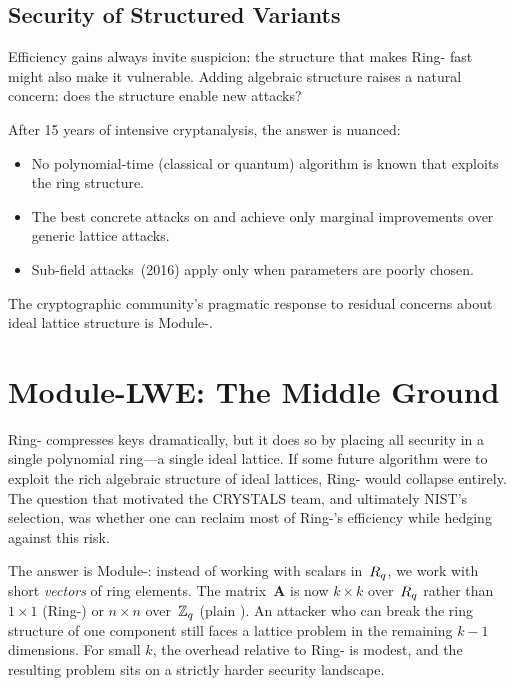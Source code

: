 \subsection{Security of Structured Variants}
\label{subsec:ring-security}

Efficiency gains always invite suspicion: the structure that makes Ring-\lwe{} fast might also make it vulnerable.  Adding algebraic structure raises a natural concern: does the structure enable new attacks?

After 15 years of intensive cryptanalysis, the answer is nuanced:
\begin{itemize}
\item No polynomial-time (classical or quantum) algorithm is known that exploits the ring structure.
\item The best concrete attacks on \rlwe{} and \mlwe{} achieve only marginal improvements over generic lattice attacks.
\item Sub-field attacks~(2016) apply only when parameters are poorly chosen.
\end{itemize}

The cryptographic community's pragmatic response to residual concerns about ideal lattice structure is Module-\lwe{}.


\section{Module-LWE: The Middle Ground}
\label{sec:module-lwe}

Ring-\lwe{} compresses keys dramatically, but it does so by placing all security in a single polynomial ring---a single ideal lattice.  If some future algorithm were to exploit the rich algebraic structure of ideal lattices, Ring-\lwe{} would collapse entirely.  The question that motivated the CRYSTALS team, and ultimately NIST's selection, was whether one can reclaim most of Ring-\lwe{}'s efficiency while hedging against this risk.

The answer is Module-\lwe{}: instead of working with scalars in~$R_q$, we work with short \emph{vectors} of ring elements.  The matrix~$\mathbf{A}$ is now $k \times k$ over~$R_q$ rather than $1 \times 1$ (Ring-\lwe{}) or $n \times n$ over~$\mathbb{Z}_q$ (plain \lwe{}).  An attacker who can break the ring structure of one component still faces a lattice problem in the remaining $k-1$ dimensions.  For small $k$, the overhead relative to Ring-\lwe{} is modest, and the resulting problem sits on a strictly harder security landscape.

